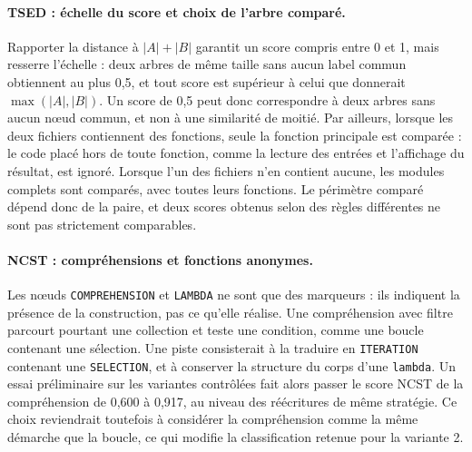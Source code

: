 \documentclass[12pt,a4paper,oneside]{report}
\begin{document}
\paragraph{TSED : échelle du score et choix de l'arbre comparé.}
Rapporter la distance à $|A| + |B|$ garantit un score compris entre 0 et 1,
mais resserre l'échelle : deux arbres de même taille sans aucun label commun
obtiennent au plus 0,5, et tout score est supérieur à celui que donnerait
$\max(|A|,|B|)$. Un score de 0,5 peut donc correspondre à deux arbres sans
aucun nœud commun, et non à une similarité de moitié. Par ailleurs, lorsque les deux fichiers contiennent des fonctions,
seule la fonction principale est comparée : le code placé hors de toute
fonction, comme la lecture des entrées et l'affichage du résultat, est
ignoré. Lorsque l'un des fichiers n'en contient aucune, les modules complets
sont comparés, avec toutes leurs fonctions. Le périmètre comparé dépend donc
de la paire, et deux scores obtenus selon des règles différentes ne sont pas
strictement comparables.

\paragraph{NCST : compréhensions et fonctions anonymes.}
Les nœuds \texttt{COMPREHENSION} et \texttt{LAMBDA} ne sont que des
marqueurs : ils indiquent la présence de la construction, pas ce qu'elle
réalise. Une compréhension avec filtre parcourt pourtant une collection et
teste une condition, comme une boucle contenant une sélection. Une piste
consisterait à la traduire en \texttt{ITERATION} contenant une
\texttt{SELECTION}, et à conserver la structure du corps d'une
\texttt{lambda}. Un essai préliminaire sur les variantes contrôlées fait
alors passer le score NCST de la compréhension de 0,600 à 0,917, au niveau
des réécritures de même stratégie. Ce choix reviendrait toutefois à
considérer la compréhension comme la même démarche que la boucle, ce qui
modifie la classification retenue pour la variante 2.
\end{document}
